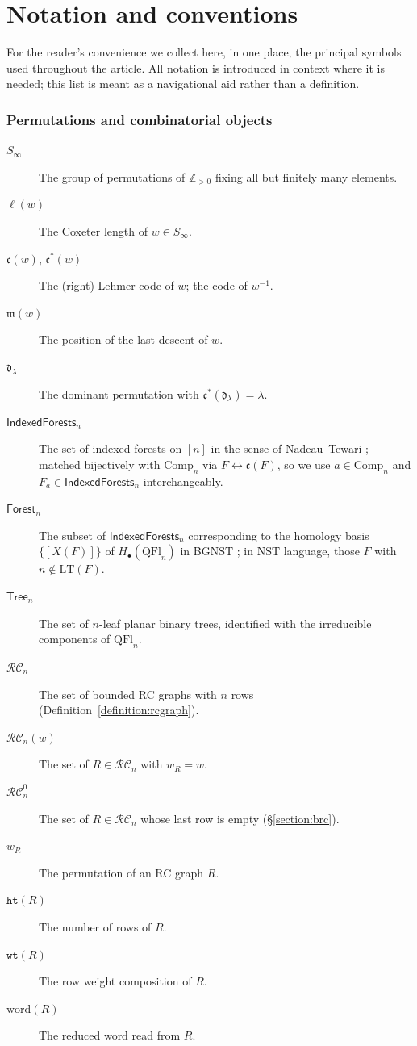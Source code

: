 \documentclass{amsart}
\theoremstyle{definition}
\theoremstyle{remark}
\numberwithin{equation}{subsection}
\newcommand{\wof}[1]{w_{#1}}
\newcommand{\wtt}{\mathtt{wt}}
\newcommand{\hr}{\mathtt{ht}}
\newcommand{\RC}{\mathcal{RC}}
\newcommand{\dom}{\mathfrak{d}}
\newcommand{\code}{\mathfrak{c}}
\newcommand{\maxd}{\mathfrak{m}}
\begin{document}
\section*{Notation and conventions}\label{section:notation}

For the reader's convenience we collect here, in one place, the principal symbols used throughout the article. All notation is introduced in context where it is needed; this list is meant as a navigational aid rather than a definition.

\begingroup
{}

\subsubsection*{Permutations and combinatorial objects}
\begin{description}
\item[$S_\infty$] The group of permutations of $\mathbb{Z}_{>0}$ fixing all but finitely many elements.
\item[$\ell(w)$] The Coxeter length of $w\in S_\infty$.
\item[$\code(w)$, $\code^*(w)$] The (right) Lehmer code of $w$; the code of $w^{-1}$.
\item[$\maxd(w)$] The position of the last descent of $w$.
\item[$\dom_\lambda$] The dominant permutation with $\code^*(\dom_\lambda)=\lambda$.
\item[$\mathsf{IndexedForests}_n$] The set of indexed forests on $[n]$ in the sense of Nadeau--Tewari \cite{nadeau2024forest}; matched bijectively with $\mathrm{Comp}_n$ via $F\leftrightarrow\code(F)$, so we use $a\in\mathrm{Comp}_n$ and $F_a\in\mathsf{IndexedForests}_n$ interchangeably.
\item[$\mathsf{Forest}_n$] The subset of $\mathsf{IndexedForests}_n$ corresponding to the homology basis $\{[X(F)]\}$ of $H_\bullet(\mathrm{QFl}_n)$ in BGNST \cite[Cor.~11.6]{bergeron2025qsymflag}; in NST language, those $F$ with $n\notin\mathrm{LT}(F)$.
\item[$\mathsf{Tree}_n$] The set of $n$-leaf planar binary trees, identified with the irreducible components of $\mathrm{QFl}_n$.
\item[$\RC_n$] The set of bounded RC graphs with $n$ rows (Definition~\ref{definition:rcgraph}).
\item[$\RC_n(w)$] The set of $R\in\RC_n$ with $\wof{R}=w$.
\item[$\RC_n^0$] The set of $R\in\RC_n$ whose last row is empty (\S\ref{section:brc}).
\item[$\wof{R}$] The permutation of an RC graph $R$.
\item[$\hr(R)$] The number of rows of $R$.
\item[$\wtt(R)$] The row weight composition of $R$.
\item[$\mathrm{word}(R)$] The reduced word read from $R$.
\end{description}
\end{document}
